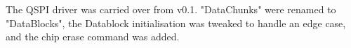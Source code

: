 The QSPI driver was carried over from v0.1. "DataChunks" were renamed to "DataBlocks", the Datablock initialisation was tweaked to handle an edge case, and the chip erase command was added.
